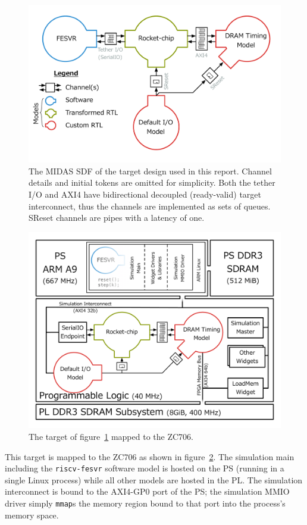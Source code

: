 \begin{figure}
	\centering
	\includegraphics[width=\textwidth]{figures/masters-target.pdf}
    \caption{The MIDAS SDF of the target design used in this report. Channel
    details and initial tokens are omitted for simplicity. Both the tether I/O
    and AXI4 have bidirectional decoupled (ready-valid) target interconnect,
    thus the channels are implemented as sets of queues. SReset channels are pipes with
    a latency of one.}
	\label{fig:default-target}
\end{figure}

\begin{figure}
	\centering
	\includegraphics[width=\textwidth]{figures/hosted-masters-target.pdf}
    \caption{The target of figure~\ref{fig:default-target} mapped to the ZC706.}
	\label{fig:hosted-masters-target}
\end{figure}

This target is mapped to the ZC706 as shown in figure~\ref{fig:hosted-masters-target}.
The simulation main including the \texttt{riscv-fesvr} software model is hosted
on the PS (running in a single Linux process) while all other models are hosted
in the PL. The simulation interconnect is bound to the AXI4-GP0 port of the PS;
the simulation MMIO driver simply \texttt{mmap}s the memory region bound to that port
into the process's memory space.
